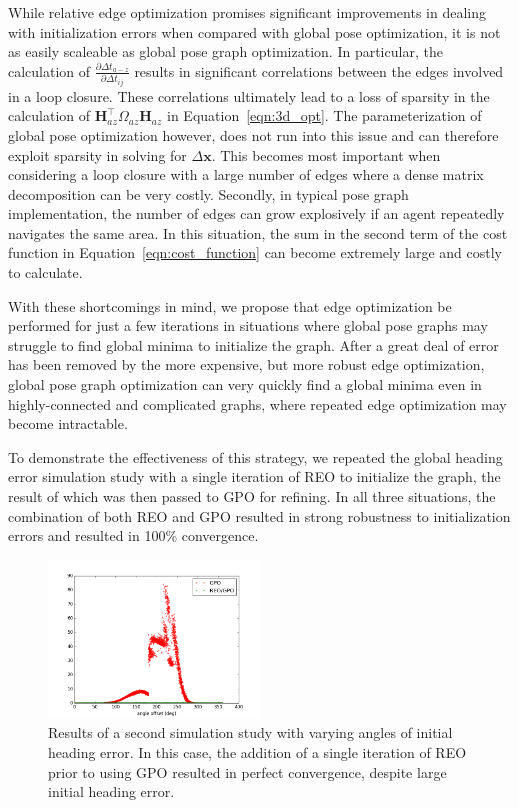 While relative edge optimization promises significant improvements in dealing with initialization errors when compared with global pose optimization, it is not as easily scaleable as global pose graph optimization.  In particular, the calculation of $\frac {\partial\Delta t_{a-z}}{\partial\Delta t_{ij}}$ results in significant correlations between the edges involved in a loop closure.  These correlations ultimately lead to a loss of sparsity in the calculation of $\mathbf{H}_{az}^\top \Omega_{az} \mathbf{H}_{az}$ in Equation~\ref{eqn:3d_opt}.  The parameterization of global pose optimization however, does not run into this issue and can therefore exploit sparsity in solving for $\Delta \mathbf{x}$.  This becomes most important when considering a loop closure with a large number of edges where a dense matrix decomposition can be very costly. Secondly, in typical pose graph implementation, the number of edges can grow explosively if an agent repeatedly navigates the same area.  In this situation, the sum in the second term of the cost function in Equation~\ref{eqn:cost_function} can become extremely large and costly to calculate.

With these shortcomings in mind, we propose that edge optimization be performed for just a few iterations in situations where global pose graphs may struggle to find global minima to initialize the graph.  After a great deal of error has been removed by the more expensive, but more robust edge optimization, global pose graph optimization can very quickly find a global minima even in highly-connected and complicated graphs, where repeated edge optimization may become intractable.

To demonstrate the effectiveness of this strategy, we repeated the global heading error simulation study with a single iteration of REO to initialize the graph, the result of which was then passed to GPO for refining.  In all three situations, the combination of both REO and GPO resulted in strong robustness to initialization errors and resulted in 100\% convergence.

\begin{figure}[H]
  \includegraphics[width=0.5\textwidth]{figures/combined_global_heading_results.png}
  \caption{Results of a second simulation study with varying angles of initial heading error.  In this case, the addition of a single iteration of REO prior to using GPO resulted in perfect convergence, despite large initial heading error.}
  \label{fig:combined_global_heading_results}
\end{figure}



